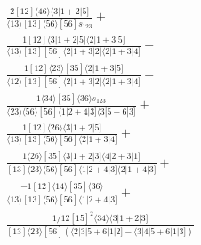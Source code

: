\documentclass[varwidth, border=5pt]{standalone}
\begin{document}
\begin{my}
$\begin{gathered}
\scriptscriptstyle\frac{2[12]⟨46⟩⟨3|1+2|5]}{⟨13⟩[13]⟨56⟩[56]s_{123}}+\\
\scriptscriptstyle\frac{1[12]⟨3|1+2|5]⟨2|1+3|5]}{⟨13⟩[13][56]⟨2|1+3|2]⟨2|1+3|4]}+\\
\scriptscriptstyle\frac{1[12]⟨23⟩[35]⟨2|1+3|5]}{⟨12⟩[13][56]⟨2|1+3|2]⟨2|1+3|4]}+\\
\scriptscriptstyle\frac{1⟨34⟩[35]⟨36⟩s_{123}}{⟨23⟩⟨56⟩[56]⟨1|2+4|3]⟨3|5+6|3]}+\\
\scriptscriptstyle\frac{1[12]⟨26⟩⟨3|1+2|5]}{⟨13⟩[13]⟨56⟩[56]⟨2|1+3|4]}+\\
\scriptscriptstyle\frac{1⟨26⟩[35]⟨3|1+2|3]⟨4|2+3|1]}{[13]⟨23⟩⟨56⟩[56]⟨1|2+4|3]⟨2|1+4|3]}+\\
\scriptscriptstyle\frac{-1[12]⟨14⟩[35]⟨36⟩}{⟨13⟩[13]⟨56⟩[56]⟨1|2+4|3]}+\\
\scriptscriptstyle\frac{1/12[15]^2⟨34⟩⟨3|1+2|3]}{[13]⟨23⟩[56](⟨2|3|5+6|1|2]-⟨3|4|5+6|1|3])}\phantom{+}
\end{gathered}$
\end{my}
\end{document}
